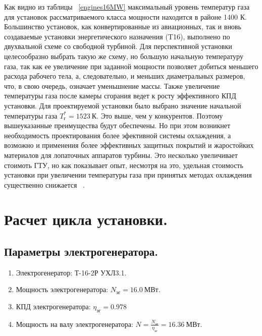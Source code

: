 \documentclass[a4paper,12pt]{article}
\begin{document}
    Как видно из таблицы ~\ref{engines16MW} максимальный уровень температур газа для установок рассматриваемого
    класса мощности находится в районе 1400 К.
    Большинство установок, как конвертированные из авиационных, так и вновь создаваемые установки энергетического
    назначения (T16), выполнено по двухвальной схеме со свободной турбиной.
    Для перспективной установки целесообразно выбрать такую же схему, но большую начальную температуру газа,
    так как ее увеличение при заданной мощности позволяет добиться меньшего расхода рабочего тела, а, следовательно,
    и меньших диаметральных размеров, что, в свою очередь, означает уменьшнение массы.
    Также увеличение температуры газа после камеры сгорания ведет к росту эффективного КПД установки.
    Для проектируемой установки было выбрано значение начальной температуры газа $T_г^* = 1523\ К$.
    Это выше, чем у конкурентов.
    Поэтому вышеуказанные преимущества будут обеспечены.
    Но при этом возникнет необходимость проектирования более эфективной системы охлаждения, а
    возможно и применения более эффективных защитных покрытий и жаростойких материалов для лопаточных
    аппаратов турбины.
    Это несколько увеличивает стоимоть ГТУ, но как показывает опыт, несмотря на это, удельная стоимость установки
    при увеличении температуры газа при принятых методах охлаждения существенно снижается ~\cite{manushin_eliseev_proektirovanie}.

    \section{Расчет цикла установки.}

    \subsection{Параметры электрогенератора.}

%    
\begin{enumerate}
	\item Электрогенератор: Т-16-2Р УХЛ3.1.
	\item Мощность электрогенератора: $N_{эг} = 16.0\ МВт$.
	\item КПД электрогенератора: $\eta_{эг} = 0.978$
	\item Мощность на валу электрогенератора: $N = \frac{N_{эг}}{\eta_{эг}} = 16.36\ МВт$.
\end{enumerate}
\end{document}
